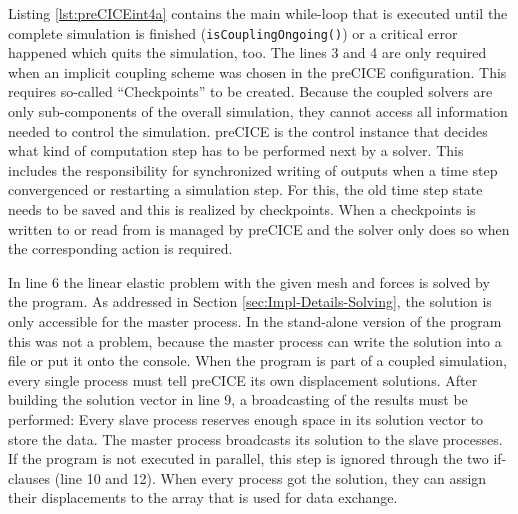    Listing \ref{lst:preCICEint4a} contains the main while-loop that is executed until the complete simulation is finished (\texttt{isCouplingOngoing()}) or a critical error happened which quits the simulation, too. The lines 3 and 4 are only required when an implicit coupling scheme was chosen in the preCICE configuration. This requires so-called ``Checkpoints'' to be created. Because the coupled solvers are only sub-components of the overall simulation, they cannot access all information needed to control the simulation. preCICE is the control instance that decides what kind of computation step has to be performed next by a solver. This includes the responsibility for synchronized writing of outputs when a time step convergenced or restarting a simulation step. For this, the old time step state needs to be saved and this is realized by checkpoints. When a checkpoints is written to or read from is managed by preCICE and the solver only does so when the corresponding action is required.
   
   In line 6 the linear elastic problem with the given mesh and forces is solved by the program. As addressed in Section \ref{sec:Impl-Details-Solving}, the solution is only accessible for the master process. In the stand-alone version of the program this was not a problem, because the master process can write the solution into a file or put it onto the console. When the program is part of a coupled simulation, every single process must tell preCICE its own displacement solutions. After building the solution vector in line 9, a broadcasting of the results must be performed: Every slave process reserves enough space in its solution vector to store the data. The master process broadcasts its solution to the slave processes. If the program is not executed in parallel, this step is ignored through the two if-clauses (line 10 and 12). When every process got the solution, they can assign their displacements to the array that is used for data exchange.
   
